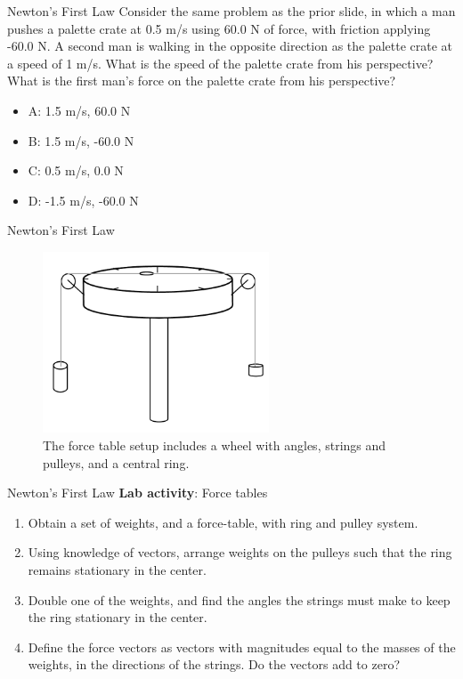 \documentclass{beamer}
\begin{document}
\begin{frame}{Newton's First Law}
\small
Consider the same problem as the prior slide, in which a man pushes a palette crate at 0.5 m/s using 60.0 N of force, with friction applying -60.0 N.  A second man is walking in the opposite direction as the palette crate at a speed of 1 m/s.  What is the speed of the palette crate from his perspective?  What is the first man's force on the palette crate from his perspective?
\begin{itemize}
\item A: 1.5 m/s, 60.0 N
\item B: 1.5 m/s, -60.0 N
\item C: 0.5 m/s, 0.0 N 
\item D: -1.5 m/s, -60.0 N
\end{itemize}
\end{frame}

\begin{frame}{Newton's First Law}
\begin{figure}
\centering
\includegraphics[width=0.6\textwidth]{figures/Table.pdf}
\caption{\label{fig:table} The force table setup includes a wheel with angles, strings and pulleys, and a central ring.}
\end{figure}
\end{frame}

\begin{frame}{Newton's First Law}
\small
\textbf{Lab activity}: Force tables
\begin{enumerate}
\item Obtain a set of weights, and a force-table, with ring and pulley system.
\item Using knowledge of vectors, arrange weights on the pulleys such that the ring remains stationary in the center.
\item Double one of the weights, and find the angles the strings must make to keep the ring stationary in the center.
\item Define the force vectors as vectors with magnitudes equal to the masses of the weights, in the directions of the strings.  Do the vectors add to zero?
\end{enumerate}
\end{frame}
\end{document}

